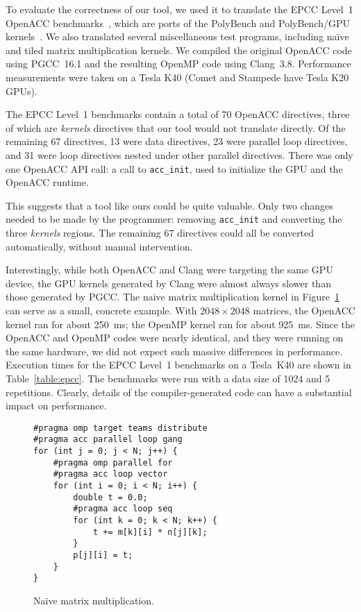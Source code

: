 \documentclass{sig-alternate-05-2015}
\begin{document}
To evaluate the correctness of our tool, we used it to translate the EPCC
Level~1 OpenACC benchmarks~\cite{epcc}, which are ports of the PolyBench and
PolyBench/GPU kernels~\cite{polybench}.  We also translated several
miscellaneous test programs, including na\"{i}ve and tiled matrix multiplication
kernels.  We compiled the original OpenACC code using PGCC~16.1 and the
resulting OpenMP code using Clang~3.8.  Performance measurements were taken on
a Tesla K40 (Comet and Stampede have Tesla K20 GPUs).

The EPCC Level~1 benchmarks contain a total of 70 OpenACC directives, three of
which are \emph{kernels} directives that our tool would not translate directly.
Of the remaining 67 directives, 13 were data directives, 23 were parallel loop
directives, and 31 were loop directives nested under other parallel directives.
There was only one OpenACC API call: a call to \texttt{acc\_init}, used to
initialize the GPU and the OpenACC runtime.

This suggests that a tool like ours could be quite valuable.  Only two changes
needed to be made by the programmer: removing \texttt{acc\_init} and converting
the three \emph{kernels} regions.  The remaining 67 directives could all be
converted automatically, without manual intervention.

Interestingly, while both OpenACC and Clang were targeting the same GPU device,
the GPU kernels generated by Clang were almost always slower than those
generated by PGCC.  The naive matrix multiplication kernel in
Figure~\ref{fig:matmul} can serve as a small, concrete example.  With $2048
\times 2048$ matrices, the OpenACC kernel ran for about 250~ms; the OpenMP
kernel ran for about 925~ms.  Since the OpenACC and OpenMP codes were nearly
identical, and they were running on the same hardware, we did not expect such
massive differences in performance.  Execution times for the EPCC Level~1
benchmarks on a Tesla~K40 are shown in Table~\ref{table:epcc}.  The benchmarks
were run with a data size of 1024 and 5 repetitions.  Clearly, details of the
compiler-generated code can have a substantial impact on performance.

\begin{figure}
\begin{verbatim}
#pragma omp target teams distribute
#pragma acc parallel loop gang
for (int j = 0; j < N; j++) {
    #pragma omp parallel for
    #pragma acc loop vector
    for (int i = 0; i < N; i++) {
        double t = 0.0;
        #pragma acc loop seq
        for (int k = 0; k < N; k++) {
            t += m[k][i] * n[j][k];
        }
        p[j][i] = t;
    }
}
\end{verbatim}
\caption{Na\"{i}ve matrix multiplication.}
\label{fig:matmul}
\end{figure}
\end{document}
